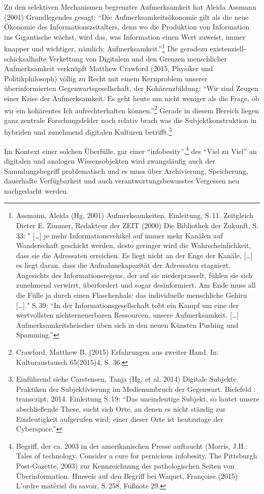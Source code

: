 \documentclass[a4paper,
fontsize=11pt,
oneside,
numbers=noperiodatend,
parskip=half-,
bibliography=totoc,
final
]{scrartcl}
\begin{document}
Zu den selektiven Mechanismen begrenzter Aufmerksamkeit hat Aleida
Assmann (2001) Grundlegendes gesagt: \enquote{Die
Aufmerksamkeitsökonomie gilt als die neue Ökonomie des
Informationszeitalters, denn wo die Produktion von Information ins
Gigantische wächst, wird das, was Information einen Wert zuweist, immer
knapper und wichtiger, nämlich: Aufmerksamkeit.}\footnote{Assmann,
  Aleida (Hg. 2001) Aufmerksamkeiten. Einleitung, S.\,11. Zeitgleich
  Dieter E. Zimmer, Redakteur der ZEIT (2000) Die Bibliothek der
  Zukunft, S.\,33: " {[}\ldots{}{]} je mehr Informationsvehikel auf immer
  mehr Kanälen auf Wanderschaft geschickt werden, desto geringer wird
  die Wahrscheinlichkeit, dass sie die Adressaten erreichen. Es liegt
  nicht an der Enge der Kanäle, {[}\ldots{}{]} es liegt daran, dass die
  Aufnahmekapazität der Adressaten stagniert. Angesichts des
  Informationsregens, der auf sie niederprasselt, fühlen sie sich
  zunehmend verwirrt, überfordert und sogar desinformiert. Am Ende muss
  all die Fülle ja durch einen Flaschenhals: das individuelle
  menschliche Gehirn {[}\ldots{}{]}." S.\,39: \enquote{In der
  Informationsgesellschaft tobt ein Kampf um eine der wertvollsten
  nichterneuerbaren Ressourcen, unsere Aufmerksamkeit. {[}\ldots{}{]}
  Aufmerksamkeitsheischer üben sich in den neuen Künsten Pushing und
  Spamming.}} Die geradezu existenziell-schicksalhafte Verkettung von
Digitalem und den Grenzen menschlicher Aufmerksamkeit verknüpft Matthew
Crawford (2015, Physiker und Politikphilosoph) völlig zu Recht mit einem
Kernproblem unserer überinformierten Gegenwartsgesellschaft, der
Kohärenzbildung: \enquote{Wir sind Zeugen einer Krise der
Aufmerksamkeit. Es geht heute um nicht weniger als die Frage, ob wir ein
kohärentes Ich aufrechterhalten können.}\footnote{Crawford, Matthew B.
  (2015) Erfahrungen aus zweiter Hand. In: Kulturaustausch 65(2015)4, S.
  36.} Gerade in diesem Bereich liegen ganz zentrale Forschungsfelder
noch relativ brach was die Subjektkonstruktion in hybriden und zunehmend
digitalen Kulturen betrifft.\footnote{Einführend siehe Carstensen, Tanja
  (Hg. et al. 2014) Digitale Subjekte. Praktiken der Subjektivierung im
  Medienumbruch der Gegenwart. Bielefeld : transcript, 2014. Einleitung
  S.\,19: \enquote{Das uneindeutige Subjekt, so lautet unsere
  abschließende These, sucht sich Orte, an denen es nicht ständig zur
  Eindeutigkeit aufgerufen wird; einer dieser Orte ist heutzutage der
  Cyberspace.}}

Im Kontext einer solchen Überfülle, gar einer
\enquote{infobesity},\footnote{Begriff, der ca. 2003 in der
  amerikanischen Presse auftaucht (Morris, J.H.: Tales of technology.
  Consider a cure for pernicious infobesity. The Pittsburgh
  Post-Gazette, 2003) zur Kennzeichnung der pathologischen Seiten von
  Überinformation. Hinweis auf den Begriff bei Waquet, Françoise (2015)
  L'ordre matériel du savoir, S.\,258, Fußnote 29.} des \enquote{Viel zu
Viel} an digitalen und analogen Wissensobjekten wird zwangsläufig auch
der Sammlungsbegriff problematisch und es muss über Archivierung,
Speicherung, dauerhafte Verfügbarkeit und auch verantwortungsbewusstes
Vergessen neu nachgedacht werden.
\end{document}
